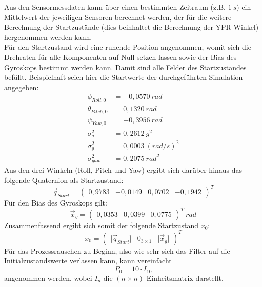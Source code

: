 \documentclass[12pt,a4paper]{article}
\begin{document}
		Aus den Sensormessdaten kann über einen bestimmten Zeitraum (z.B. $1~s$) ein Mittelwert der jeweiligen Sensoren berechnet werden, der für die weitere Berechnung der Startzustände (dies beinhaltet die Berechnung der YPR-Winkel) hergenommen werden kann.\\
		Für den Startzustand wird eine ruhende Position angenommen, womit sich die Drehraten für alle Komponenten auf Null setzen lassen sowie der Bias des Gyroskops bestimmt werden kann. Damit sind alle Felder des Startzustandes befüllt. Beispielhaft seien hier die Startwerte der durchgeführten Simulation angegeben:
		\begin{align}
			\phi_{Roll,0}&=-0,0570~rad\\
			\theta_{Pitch,0}&=0,1320~rad\\
			\psi_{Yaw,0}&=-0,3956~rad\\
			\sigma_{a}^{2}&=0,2612~g^{2}\\
			\sigma_{g}^{2}&=0,0003~(rad/s)^{2}\\
			\sigma_{yaw}^{2}&=0,2075~rad^{2}
		\end{align}
		Aus den drei Winkeln (Roll, Pitch und Yaw) ergibt sich darüber hinaus das folgende Quaternion als Startzustand:
		\begin{equation}
			\vec{q}_{Start}=\begin{pmatrix}
			0,9783 & -0,0149 & 0,0702 & -0,1942
			\end{pmatrix}^{T}	
		\end{equation}
		Für den Bias des Gyroskops gilt:
		\begin{equation}
			\vec{x}_{g}=\begin{pmatrix}
			0,0353 & 0,0399 & 0,0775
			\end{pmatrix}^{T}~rad
		\end{equation}
		Zusammenfassend ergibt sich somit der folgende Startzustand $x_{0}$:
		\begin{equation}
			x_{0}=\begin{pmatrix}
			\big[\vec{q}_{Start}\big]& 0_{3\times 1} & \big[\vec{x}_{g}\big]
			\end{pmatrix}^{T}
		\end{equation}
		Für das Prozessrauschen zu Beginn, also wie sehr sich das Filter auf die Initialzustandswerte verlassen kann, kann vereinfacht
		\begin{equation}
			P_{0}=10\cdot I_{10}
		\end{equation}
		angenommen werden, wobei $I_{n}$ die $(n\times n)$-Einheitsmatrix darstellt.
\end{document}
